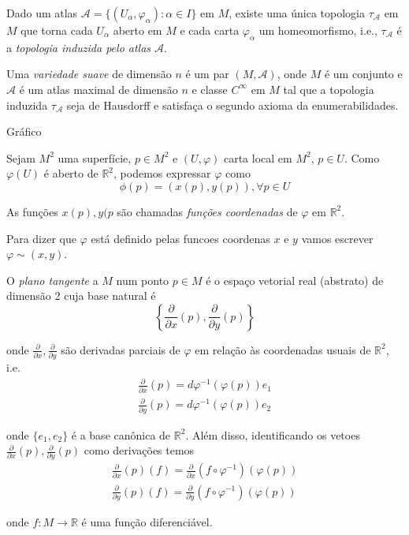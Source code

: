\begin{lema}
	Dado um atlas $\mathcal{A} = \{ (U_{\alpha}, \varphi_{\alpha}): \alpha \in I \}$ em $M$, existe uma única topologia $\tau_{\mathcal{A}}$ em $M$ que torna cada $U_{\alpha}$ aberto em $M$ e cada carta $\varphi_{\alpha}$ um homeomorfismo, i.e., $\tau_{\mathcal{A}}$ é a \emph{topologia induzida pelo atlas $\mathcal{A}$}.
\end{lema}

\begin{defi}
	Uma \emph{variedade suave} de dimensão $n$ é um par $(M, \mathcal{A})$, onde $M$ é um conjunto e $\mathcal{A}$ é um atlas maximal de dimensão $n$ e classe $C^{\infty}$ em $M$ tal que a topologia induzida $\tau_{\mathcal{A}}$ seja de Hausdorff e satisfaça o segundo axioma da enumerabilidades.
\end{defi}

Gráfico

Sejam $M^2$ uma superfície, $p \in M^2$ e $(U, \varphi)$ carta local em $M^2$, $p \in U$. Como $\varphi(U)$ é aberto de $\mathbb{R}^2$, podemos expressar $\varphi$ como
\begin{equation*}
	\phi(p) = (x(p), y(p)), \forall p \in U
\end{equation*}

As funções $x(p), y(p$ são chamadas \emph{funções coordenadas} de $\varphi$ em $\mathbb{R}^2$.

\begin{nota}
	Para dizer que $\varphi$ está definido pelas funcoes coordenas $x$ e $y$ vamos escrever $\varphi \sim  (x,y)$.
\end{nota}

\begin{defi}
	O \emph{plano tangente} a $M$ num ponto $p \in M$ é o espaço vetorial real (abstrato) de dimensão 2 cuja base natural é
	\begin{equation*}
		\left\{ \frac{\partial}{\partial x} (p), \frac{\partial}{\partial y} (p) \right\}
	\end{equation*}
	
	onde $\frac{\partial}{\partial x}, \frac{\partial}{\partial y}$ são derivadas parciais de $\varphi$ em relação às coordenadas usuais de $\mathbb{R}^2$, i.e.
	\begin{align*}
		\frac{\partial}{\partial x} (p) = d \varphi^{-1} ( \varphi(p) ) e_1\\
		\frac{\partial}{\partial y} (p) = d \varphi^{-1} ( \varphi(p) ) e_2
	\end{align*}
	
	onde $\{ e_1,e_2 \}$ é a base canônica de $\mathbb{R}^2$. Além disso, identificando os vetoes $\frac{\partial}{\partial x} (p), \frac{\partial}{\partial y} (p)$ como derivações temos
	\begin{align*}
		\frac{\partial}{\partial x} (p) (f) = \frac{\partial}{\partial x} \left( f \circ \varphi^{-1} \right) (\varphi(p))\\
		\frac{\partial}{\partial y} (p) (f) = \frac{\partial}{\partial y} \left( f \circ \varphi^{-1} \right) (\varphi(p))
	\end{align*}
	
	onde $f: M \rightarrow \mathbb{R}$ é uma função diferenciável.
\end{defi}

